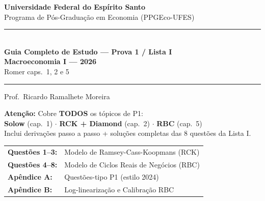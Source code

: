 \documentclass[12pt, a4paper]{article}
\begin{document}

\begin{titlepage}
\begin{center}
\vspace*{1.5cm}
{\Large\bfseries Universidade Federal do Espírito Santo}\\[0.5em]
{\large Programa de Pós-Graduação em Economia (PPGEco-UFES)}\\[2em]

\rule{\linewidth}{1.2pt}\\[0.8em]
{\LARGE\bfseries\color{cyanrbc} Guia Completo de Estudo --- Prova 1 / Lista I\\[0.4em]
\large Macroeconomia I --- 2026}\\[0.4em]
{\normalsize\color{grayrbc} Romer caps.\ 1, 2 e 5}\\[0.8em]
\rule{\linewidth}{1.2pt}

\vspace{1em}
{\large Prof.\ Ricardo Ramalhete Moreira}

\vspace{1.5em}
\begin{tcolorbox}[standard, colback=provabg, colframe=provaborder, width=0.88\textwidth,
  arc=4pt, boxrule=1.2pt, left=8pt, right=8pt, top=6pt, bottom=6pt]
\centering
\textbf{\textcolor{provaborder}{Atenção:}} Cobre \textbf{TODOS} os tópicos de P1:\\[0.3em]
\textbf{Solow} (cap.\ 1) $\cdot$ \textbf{RCK + Diamond} (cap.\ 2) $\cdot$ \textbf{RBC} (cap.\ 5)\\[0.3em]
Inclui derivações passo a passo + soluções completas das 8 questões da Lista I.
\end{tcolorbox}

\vspace{1.5em}
\begin{tabular}{ll}
\toprule
\textbf{Questões 1--3:} & Modelo de Ramsey-Cass-Koopmans (RCK) \\[0.4em]
\textbf{Questões 4--8:} & Modelo de Ciclos Reais de Negócios (RBC) \\[0.4em]
\textbf{Apêndice A:}    & Questões-tipo P1 (estilo 2024) \\[0.4em]
\textbf{Apêndice B:}    & Log-linearização e Calibração RBC \\
\bottomrule
\end{tabular}


\end{center}
\end{titlepage}
\end{document}
